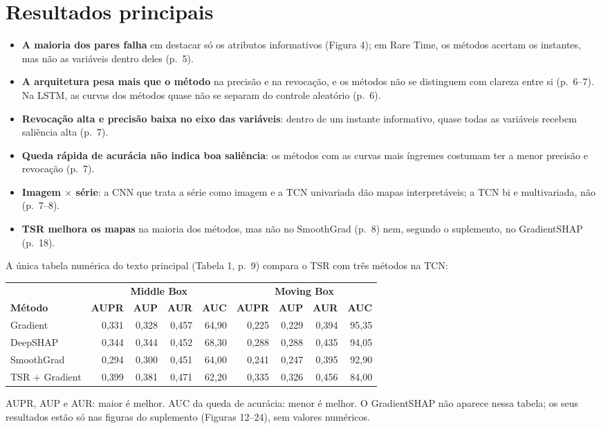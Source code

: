 \documentclass[11pt,a4paper]{article}
\begin{document}
\section{Resultados principais}
\begin{itemize}
\item \textbf{A maioria dos pares falha} em destacar só os atributos informativos (Figura 4); em Rare Time, os métodos acertam os instantes, mas não as variáveis dentro deles (p.~5).
\item \textbf{A arquitetura pesa mais que o método} na precisão e na revocação, e os métodos não se distinguem com clareza entre si (p.~6--7). Na LSTM, as curvas dos métodos quase não se separam do controle aleatório (p.~6).
\item \textbf{Revocação alta e precisão baixa no eixo das variáveis}: dentro de um instante informativo, quase todas as variáveis recebem saliência alta (p.~7).
\item \textbf{Queda rápida de acurácia não indica boa saliência}: os métodos com as curvas mais íngremes costumam ter a menor precisão e revocação (p.~7).
\item \textbf{Imagem $\times$ série}: a CNN que trata a série como imagem e a TCN univariada dão mapas interpretáveis; a TCN bi e multivariada, não (p.~7--8).
\item \textbf{TSR melhora os mapas} na maioria dos métodos, mas não no SmoothGrad (p.~8) nem, segundo o suplemento, no GradientSHAP (p.~18).
\end{itemize}
A única tabela numérica do texto principal (Tabela 1, p.~9) compara o TSR com três métodos na TCN:
\begin{center}\small
\begin{tabular}{lrrrrrrrr}
\toprule
& \multicolumn{4}{c}{\textbf{Middle Box}} & \multicolumn{4}{c}{\textbf{Moving Box}} \\
\cmidrule(lr){2-5}\cmidrule(lr){6-9}
\textbf{Método} & \textbf{AUPR} & \textbf{AUP} & \textbf{AUR} & \textbf{AUC} & \textbf{AUPR} & \textbf{AUP} & \textbf{AUR} & \textbf{AUC} \\
\midrule
Gradient & 0,331 & 0,328 & 0,457 & 64,90 & 0,225 & 0,229 & 0,394 & 95,35 \\
DeepSHAP & 0,344 & 0,344 & 0,452 & 68,30 & 0,288 & 0,288 & 0,435 & 94,05 \\
SmoothGrad & 0,294 & 0,300 & 0,451 & 64,00 & 0,241 & 0,247 & 0,395 & 92,90 \\
TSR + Gradient & 0,399 & 0,381 & 0,471 & 62,20 & 0,335 & 0,326 & 0,456 & 84,00 \\
\bottomrule
\end{tabular}
\end{center}
AUPR, AUP e AUR: maior é melhor. AUC da queda de acurácia: menor é melhor. O GradientSHAP não aparece nessa tabela; os seus resultados estão só nas figuras do suplemento (Figuras 12--24), sem valores numéricos.
\end{document}
